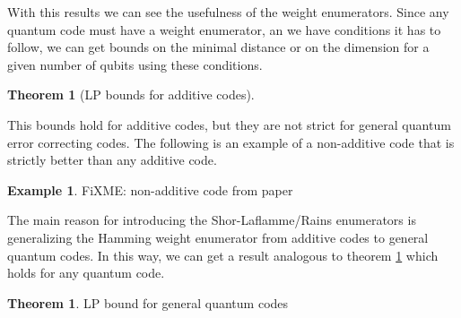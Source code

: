 \documentclass{article}
\theoremstyle{definition}
\newtheorem{theorem}[Satz]{Theorem}
\newtheorem{ex}[Satz]{Example}
\begin{document}
With this results we can see the usefulness of the weight enumerators. Since any quantum code must have a weight enumerator, an we have conditions it has to follow, we can get bounds on the minimal distance or on the dimension for a given number of qubits using these conditions.

\begin{theorem}[LP bounds for additive codes]\label{lpadditive}

\end{theorem}

This bounds hold for additive codes, but they are not strict for general quantum error correcting codes. The following is an example of a non-additive code that is strictly better than any additive code.

\begin{ex}
FiXME: non-additive code from paper
\end{ex}

The main reason for introducing the Shor-Laflamme/Rains enumerators is generalizing the Hamming weight enumerator from additive codes to general quantum codes. In this way, we can get a result analogous to theorem \ref{lpadditive} which holds for any quantum code. 

\begin{theorem}
LP bound for general quantum codes
\end{theorem}
\end{document}
